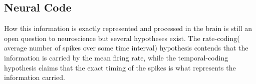\documentclass{report}
\begin{document}
\subsection{Neural Code}
How this information is exactly represented and processed in the brain is still an open question to neuroscience but several hypotheses exist. The rate-coding( average number of spikes over some time interval) hypothesis \cite{ Salzman1992} \cite{Tovee1993} contends that the information is carried by the mean firing rate, while the temporal-coding   hypothesis \cite{Bair1996} \cite{buracas1998} \cite{Rucci2018} claims that the exact timing of the spikes is what represents the information carried.


\end{document}
